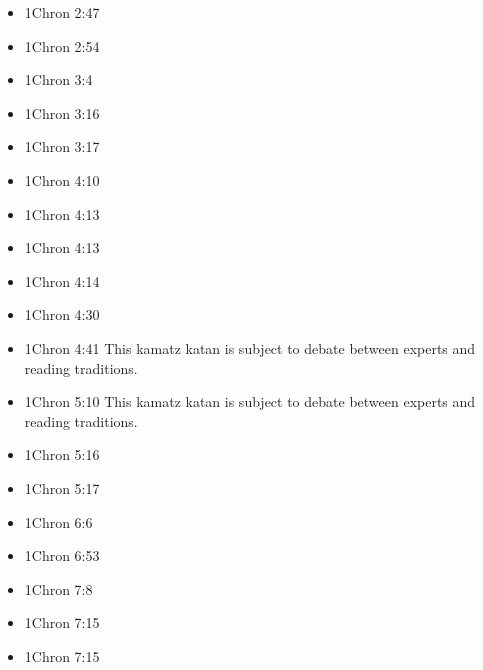 \documentclass[14pt]{book}
\begin{document}
\begin{multicols}{2}
\begin{itemize}
				\item 1Chron 2:47
				
				\item 1Chron 2:54
				
				\item 1Chron 3:4
				
				\item 1Chron 3:16
				
				\item 1Chron 3:17
				
				\item 1Chron 4:10
				
				\item 1Chron 4:13
				
				\item 1Chron 4:13
				
				\item 1Chron 4:14
				
				\item 1Chron 4:30
				
				\item 1Chron 4:41 This kamatz katan is subject to debate between experts and reading traditions.
				
				\item 1Chron 5:10 This kamatz katan is subject to debate between experts and reading traditions.
				
				\item 1Chron 5:16
				
				\item 1Chron 5:17
				
				\item 1Chron 6:6
				
				\item 1Chron 6:53
						
						\item 1Chron 7:8
						
						\item 1Chron 7:15
						
						\item 1Chron 7:15
						

\end{itemize}
\end{multicols}
\end{document}
